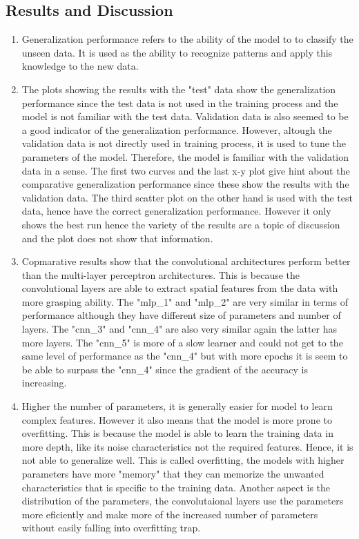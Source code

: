 \documentclass[3p,times,procedia]{elsarticle}
\begin{document}
\subsection{\textbf{Results and Discussion}}
\begin{enumerate}
    \item Generalization performance refers to the ability of the model to to classify the unseen data. It is used as the ability to recognize patterns and apply this knowledge to the new data.
    \item The plots showing the results with the "test" data show the generalization performance since the test data is not used in the training process and the model is not familiar with the test data.
    Validation data is also seemed to be a good indicator of the generalization performance. However, altough  the validation data is not directly used in training process, it is used to tune the parameters of the model. Therefore, the model is familiar with the validation data in a sense.
    The first two curves and the last x-y plot give hint about the comparative generalization performance since these show the results with the validation data.
    The third scatter plot on the other hand is used with the test data, hence have the correct generalization performance. However it only shows the best run hence the variety of the results are a topic of discussion and the plot does not show that information.

    \item Copmarative results show that the convolutional architectures perform better than the multi-layer perceptron architectures. This is because the convolutional layers are able to extract spatial features from the data with more grasping ability.
    The "mlp\_1" and "mlp\_2" are very similar in terms of performance although they have different size of parameters and number of layers.
    The "cnn\_3" and "cnn\_4" are also very similar again the latter has more layers. 
    The "cnn\_5" is more of a slow learner and could not get to the same level of performance as the "cnn\_4" but with more epochs it is seem to be able to surpass the "cnn\_4" since the gradient of the accuracy is increasing.

    \item Higher the number of parameters, it is generally easier for model to learn complex features. However it also means that the model is more prone to overfitting.
    This is because the model is able to learn the training data in more depth, like its noise characteristics not the required features. Hence, it is not able to generalize well.
    This is called overfitting, the models with higher parameters have more "memory" that they can memorize the unwanted characteristics that is specific to the training data.
    Another aspect is the distribution of the parameters, the convolutaional layers use the parameters more eficiently and make more of the increased number of parameters without easily falling into overfitting trap.
    

\end{enumerate}
\end{document}

